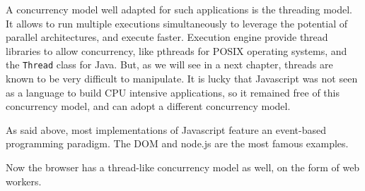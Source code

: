 










A concurrency model well adapted for such applications is the threading model.
It allows to run multiple executions simultaneously to leverage the potential of parallel architectures, and execute faster.
Execution engine provide thread libraries to allow concurrency, like pthreads for POSIX operating systems, and the \texttt{Thread} class for Java.
But, as we will see in a next chapter, threads are known to be very difficult to manipulate.
It is lucky that Javascript was not seen as a language to build CPU intensive applications, so it remained free of this concurrency model, and can adopt a different concurrency model.



















As said above, most implementations of Javascript feature an event-based programming paradigm.
The DOM and node.js are the most famous examples.

Now the browser has a thread-like concurrency model as well, on the form of web workers.


